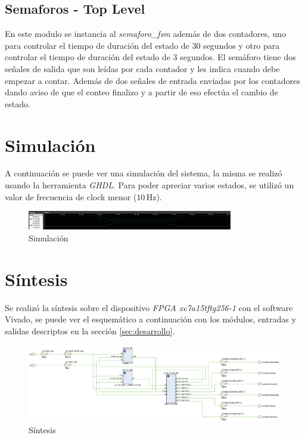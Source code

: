 \documentclass[titlepage,a4paper]{article}
\begin{document}
\subsection{Semaforos - Top Level}
En este modulo se instancia al \textit{semaforo\_fsm} además de dos contadores, uno para controlar el tiempo de duración del estado de 30 segundos y otro para controlar el tiempo de duración del estado de 3 segundos. El semáforo tiene dos señales de salida que son leídas por cada contador y les indica cuando debe empezar a contar. Además de dos señales de entrada enviadas por los contadores dando aviso de que el conteo finalizo y a partir de eso efectúa el cambio de estado. 

\section{Simulación}\label{sec:simulacion}
A continuación se puede ver una simulación del sistema, la misma se realizó usando la herramienta \textit{GHDL}. Para poder apreciar varios estados, se utilizó un valor de frecuencia de clock menor ($10 \, \text{Hz}$).

\begin{figure}[H]
\centering
\includegraphics[width=0.8\textwidth]{figures/simulacion.jpeg}
\caption{\label{fig:simulacion}Simulación}
\end{figure}

\section{Síntesis}\label{sec:sintesis}
Se realizó la síntesis sobre el dispositivo \textit{FPGA xc7a15tftg256-1} con el software Vivado, se puede ver el esquemático a continuación con los módulos, entradas y salidas descriptos en la sección \ref{sec:desarrollo}.

\begin{figure}[H]
\centering
\includegraphics[width=1.1\textwidth]{figures/schematic.png}
\caption{\label{fig:simulacion}Síntesis}
\end{figure}
\end{document}
